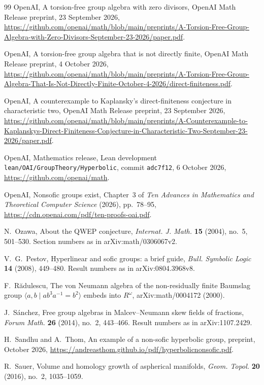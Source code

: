 \documentclass[11pt]{article}
\theoremstyle{definition}
\theoremstyle{remark}
\numberwithin{equation}{section}
\begin{document}
\begin{thebibliography}{99}
OpenAI,
A torsion-free group algebra with zero divisors,
OpenAI Math Release preprint, 23 September 2026, \url{https://github.com/openai/math/blob/main/preprints/A-Torsion-Free-Group-Algebra-with-Zero-Divisors-September-23-2026/paper.pdf}.

OpenAI,
A torsion-free group algebra that is not directly finite,
OpenAI Math Release preprint, 4 October 2026, \url{https://github.com/openai/math/blob/main/preprints/A-Torsion-Free-Group-Algebra-That-Is-Not-Directly-Finite-October-4-2026/direct-finiteness.pdf}.

OpenAI,
A counterexample to Kaplansky's direct-finiteness conjecture in characteristic two,
OpenAI Math Release preprint, 23 September 2026, \url{https://github.com/openai/math/blob/main/preprints/A-Counterexample-to-Kaplanskys-Direct-Finiteness-Conjecture-in-Characteristic-Two-September-23-2026/paper.pdf}.

OpenAI,
Mathematics release, Lean development \texttt{lean/OAI/GroupTheory/Hyperbolic}, commit \texttt{adc7f12}, 6 October 2026, \url{https://github.com/openai/math}.

OpenAI,
Nonsofic groups exist,
Chapter~3 of \emph{Ten Advances in Mathematics and Theoretical Computer Science} (2026), pp.~78--95, \url{https://cdn.openai.com/pdf/ten-proofs-oai.pdf}.

N.~Ozawa,
About the QWEP conjecture,
\emph{Internat. J. Math.} \textbf{15} (2004), no.~5, 501--530. Section numbers as in arXiv:math/0306067v2.

V.~G.~Pestov,
Hyperlinear and sofic groups: a brief guide,
\emph{Bull. Symbolic Logic} \textbf{14} (2008), 449--480. Result numbers as in arXiv:0804.3968v8.

F.~R\u{a}dulescu,
The von Neumann algebra of the non-residually finite Baumslag group $\langle a,b\mid ab^3a^{-1}=b^2\rangle$ embeds into $R^\omega$,
arXiv:math/0004172 (2000).

J.~S\'anchez,
Free group algebras in Malcev--Neumann skew fields of fractions,
\emph{Forum Math.} \textbf{26} (2014), no.~2, 443--466. Result numbers as in arXiv:1107.2429.

H.~Sandhu and A.~Thom,
An example of a non-sofic hyperbolic group,
preprint, October 2026, \url{https://andreasthom.github.io/pdf/hyperbolicnonsofic.pdf}.

R.~Sauer,
Volume and homology growth of aspherical manifolds,
\emph{Geom. Topol.} \textbf{20} (2016), no.~2, 1035--1059.


\end{thebibliography}
\end{document}
